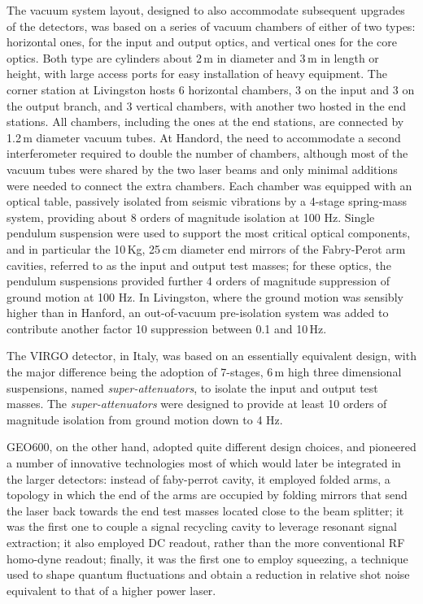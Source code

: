 The vacuum system layout, designed to also accommodate subsequent upgrades of the detectors, was based on a series of vacuum chambers of either of two types: horizontal ones, for the input and output optics, and vertical ones for the core optics. Both type are cylinders about 2\,m in diameter and 3\,m in length or height, with large access ports for easy installation of heavy equipment. The corner station at Livingston hosts 6 horizontal chambers, 3 on the input and 3  on the output branch, and 3 vertical chambers, with another two hosted in the end stations. All chambers, including the ones at the end stations, are connected by 1.2\,m diameter vacuum tubes. At Handord, the need to accommodate a second interferometer required to double the number of chambers, although most of the vacuum tubes were shared by the two laser beams and only minimal additions were needed to connect the extra chambers.
Each chamber was equipped with an optical table, passively isolated from seismic vibrations by a 4-stage spring-mass system, providing about 8 orders of magnitude isolation at 100 Hz. Single pendulum suspension were used to support the most critical optical components, and in particular the 10\,Kg, 25\,cm diameter end mirrors of the Fabry-Perot arm cavities, referred to as the input and output test masses; for these optics, the pendulum suspensions provided further 4 orders of magnitude suppression of ground motion at 100 Hz. In Livingston, where the ground motion was sensibly higher than in Hanford, an out-of-vacuum pre-isolation system was added to contribute another factor 10 suppression between 0.1 and 10\,Hz.

The VIRGO detector, in Italy, was based on an essentially equivalent design, with the major difference being the adoption of 7-stages, 6\,m high three dimensional suspensions, named \textit{super-attenuators}, to isolate the input and output test masses. The \textit{super-attenuators} were designed to provide at least 10 orders of magnitude isolation from ground motion down to 4 Hz.

GEO600, on the other hand, adopted quite different design choices, and pioneered a number of innovative technologies most of which would later be integrated in the larger detectors: instead of faby-perrot cavity, it employed folded arms, a topology in which the end of the arms are occupied by folding mirrors that send the laser back towards the end test masses located close to the beam splitter; it was the first one to couple a signal recycling cavity to leverage resonant signal extraction; it also employed DC readout, rather than the more conventional RF homo-dyne readout; finally, it was the first one to employ squeezing, a technique used to shape quantum fluctuations and obtain a reduction in relative shot noise equivalent to that of a higher power laser.

